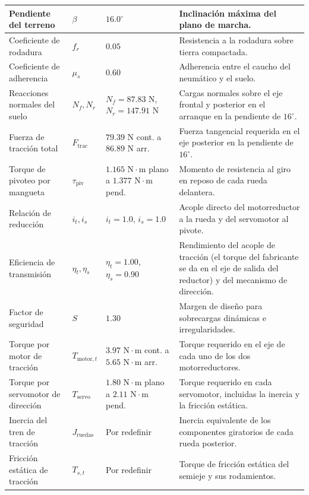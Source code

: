 \documentclass[../../General.tex]{subfiles}
\begin{document}
\begin{center}
\begin{xltabular}{\textwidth}{|p{3.5cm}|>{\centering\arraybackslash}p{2.5cm}|>{\centering\arraybackslash}p{2.5cm}|>{\centering\arraybackslash}X|}
        Pendiente del terreno & $\beta$ & $16.0^\circ$ & Inclinación máxima del plano de marcha. \\ \hline
        Coeficiente de rodadura & $f_r$ & $0.05$ & Resistencia a la rodadura sobre tierra compactada. \\ \hline
        Coeficiente de adherencia & $\mu_s$ & $0.60$ & Adherencia entre el caucho del neumático y el suelo. \\ \hline
        Reacciones normales del suelo & $N_f, N_r$ & $N_f = 87.83\text{ N}$, $N_r = 147.91\text{ N}$ & Cargas normales sobre el eje frontal y posterior en el arranque en la pendiente de $16^\circ$. \\ \hline
        Fuerza de tracción total & $F_{\text{trac}}$ & $79.39\text{ N}$ cont. a $86.89\text{ N}$ arr. & Fuerza tangencial requerida en el eje posterior en la pendiente de $16^\circ$. \\ \hline
        Torque de pivoteo por mangueta & $\tau_{\text{piv}}$ & $1.165\text{ N}\cdot\text{m}$ plano a $1.377\text{ N}\cdot\text{m}$ pend. & Momento de resistencia al giro en reposo de cada rueda delantera. \\ \hline
        Relación de reducción & $i_t, i_s$ & $i_t = 1.0$, $i_s = 1.0$ & Acople directo del motorreductor a la rueda y del servomotor al pivote. \\ \hline
        Eficiencia de transmisión & $\eta_t, \eta_s$ & $\eta_t = 1.00$, $\eta_s = 0.90$ & Rendimiento del acople de tracción (el torque del fabricante se da en el eje de salida del reductor) y del mecanismo de dirección. \\ \hline
        Factor de seguridad & $S$ & $1.30$ & Margen de diseño para sobrecargas dinámicas e irregularidades. \\ \hline
        Torque por motor de tracción & $T_{\text{motor},t}$ & $3.97\text{ N}\cdot\text{m}$ cont. a $5.65\text{ N}\cdot\text{m}$ arr. & Torque requerido en el eje de cada uno de los dos motorreductores. \\ \hline
        Torque por servomotor de dirección & $T_{\text{servo}}$ & $1.80\text{ N}\cdot\text{m}$ plano a $2.11\text{ N}\cdot\text{m}$ pend. & Torque requerido en cada servomotor, incluidas la inercia y la fricción estática. \\ \hline
        Inercia del tren de tracción & $J_{\text{ruedas}}$ & Por redefinir & Inercia equivalente de los componentes giratorios de cada rueda posterior. \\ \hline
        Fricción estática de tracción & $T_{s,t}$ & Por redefinir & Torque de fricción estática del semieje y sus rodamientos. \\ \hline

\end{xltabular}
\end{center}
\end{document}
